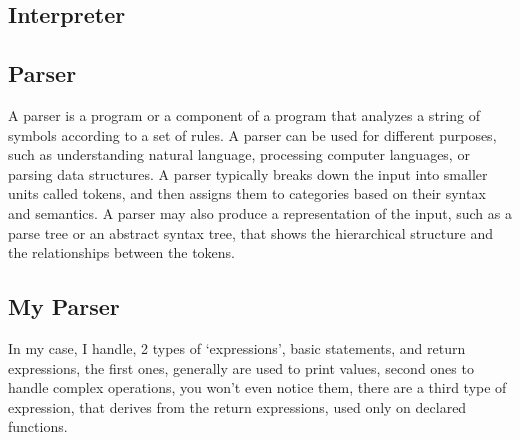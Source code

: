 \begin{center}
    \centering
    \section{Interpreter}
\end{center}

\subsection{Parser}

A parser is a program or a component of a program that analyzes a string of symbols according to a set of rules. A parser can be used for different purposes, such as understanding natural language, processing computer languages, or parsing data structures. A parser typically breaks down the input into smaller units called tokens, and then assigns them to categories based on their syntax and semantics. A parser may also produce a representation of the input, such as a parse tree or an abstract syntax tree, that shows the hierarchical structure and the relationships between the tokens.

\subsection{My Parser}

In my case, I handle, 2 types of `expressions', basic statements, and return expressions, the first ones, generally are used to print values, second ones to handle complex operations, you won't even notice them, there are a third type of expression, that derives from the return expressions, used only on declared functions.

